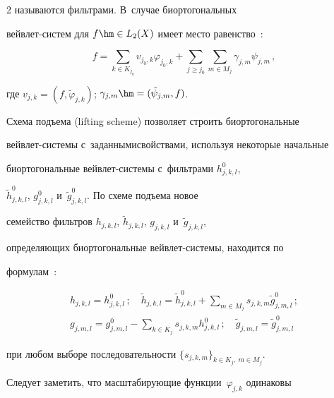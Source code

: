 \begin{multicols}{2}
называются фильтрами. В~случае би\-ор\-то\-го\-наль\-ных  


вейв\-лет-сис\-тем для $f\hm\in L_2(X)$ имеет мес\-то равенство~\cite{5-bos, 8-bos}:


  $$


  f=\sum\limits_{k\in K_{j_0}} v_{j_0,k}\varphi_{j_0,k}+ \sum\limits_{j\geq j_0} 


\sum\limits_{m\in M_j} \gamma_{j,m}\psi_{j,m}\,,


  $$ 


  где $v_{j,k} = (f,\tilde{\varphi}_{j,k})$; $\gamma_{j,m} \hm= 


(\tilde{\psi}_{j,m},f)$. 


  


  Схема подъема (lifting scheme) позволяет строить би\-ор\-то\-го\-наль\-ные  


вейв\-лет-сис\-те\-мы с~заданными\linebreak свойствами, используя некоторые начальные 


би\-ор\-то\-го\-наль\-ные вейв\-лет-сис\-те\-мы с~фильт\-ра\-ми $h^0_{j,k,l}$, 


$\tilde{h}^0_{j,k,l}$, $g^0_{j,k,l}$ и~$\tilde{g}^0_{j,k,l}$. По схеме подъема новое 


семейство фильт\-ров $h_{j,k,l}$, $\tilde{h}_{j,k,l}$, $g_{j,k,l}$ и~$\tilde{g}_{j,k,l}$, 


опре\-де\-ля\-ющих биортогональные вейв\-лет-сис\-те\-мы, находится по 


формулам~\cite{5-bos}:


  \begin{gather*}


  h_{j,k,l} =h^0_{j,k,l}\,;\quad


  \tilde{h}_{j,k,l} =\tilde{h}^0_{j,k,l} 


+\sum\limits_{m\in M_j} s_{j,k,m}\tilde{g}^0_{j,m,l}\,;\\


  g_{j,m,l}= g^0_{j,m,l} -\sum\limits_{k\in K_j} s_{j,k,m} 


h^0_{j,k,l}\,;\quad


  \tilde{g}_{j,m,l}=\tilde{g}^0_{j,m,l} 


  \end{gather*}


при любом выборе последовательности $\{ s_{j,k,m}\}_{k\in K_j, \ m\in M_j}$. 


Следует заметить, что мас\-шта\-би\-ру\-ющие функции~$\varphi_{j,k}$ одинаковы 



\end{multicols}
